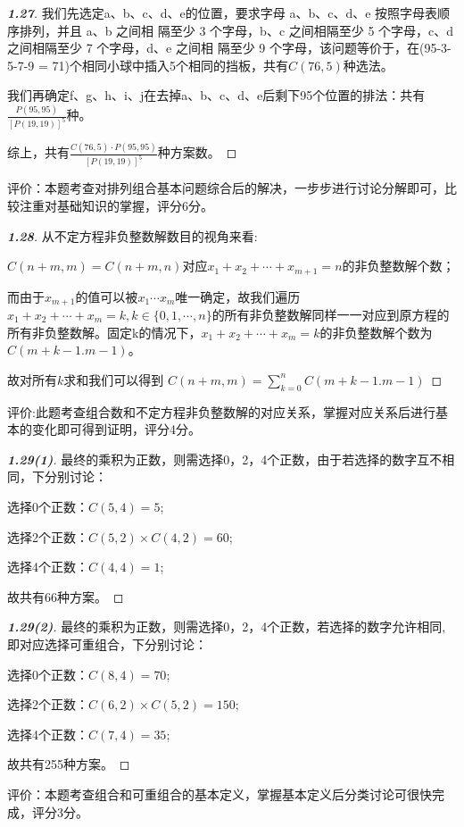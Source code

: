 \documentclass[12pt]{article}
\begin{document}
\begin{proof}[\textbf{1.27}]
    我们先选定a、b、c、d、e的位置，要求字母 a、b、c、d、e 按照字母表顺序排列，并且 a、b 之间相
隔至少 3 个字母，b、c 之间相隔至少 5 个字母，c、d 之间相隔至少 7 个字母，d、e 之间相
隔至少 9 个字母，该问题等价于，在(95-3-5-7-9 = 71)个相同小球中插入5个相同的挡板，共有$C(76,5)$种选法。

我们再确定f、g、h、i、j在去掉a、b、c、d、e后剩下95个位置的排法：共有$\frac{P(95,95)}{[P(19,19)]^5}$种。

综上，共有$\frac{C(76,5)\cdot P(95,95)}{[P(19,19)]^5}$种方案数。
\end{proof}
评价：本题考查对排列组合基本问题综合后的解决，一步步进行讨论分解即可，比较注重对基础知识的掌握，评分6分。

\begin{proof}[\textbf{1.28}]
    从不定方程非负整数解数目的视角来看:
    
    $C(n+m,m)=C(n+m,n)$对应$x_1 + x_2 + \cdots + x_{m+1} = n$的非负整数解个数；
    
    而由于$x_{m+1}$的值可以被$x_1\cdots x_m$唯一确定，故我们遍历$x_1 + x_2 + \cdots + x_m = k, k\in \{0,1,\cdots,n\}$的所有非负整数解同样一一对应到原方程的所有非负整数解。固定k的情况下，$x_1 + x_2 + \cdots + x_m = k$的非负整数解个数为$C(m+k-1.m-1)$。
    
    故对所有$k$求和我们可以得到 $C(n+m,m) = \sum_{k=0}^{n}C(m+k-1.m-1)$
\end{proof}
评价:此题考查组合数和不定方程非负整数解的对应关系，掌握对应关系后进行基本的变化即可得到证明，评分4分。

\begin{proof}[\textbf{1.29(1)}]
    最终的乘积为正数，则需选择0，2，4个正数，由于若选择的数字互不相同，下分别讨论：
    
    选择0个正数：$C(5,4) = 5$; 
    
    选择2个正数：$C(5,2) \times C(4,2) = 60$; 
    
    选择4个正数：$C(4,4) = 1$; 
    
    故共有66种方案。
\end{proof}
\begin{proof}[\textbf{1.29(2)}]
    最终的乘积为正数，则需选择0，2，4个正数，若选择的数字允许相同,即对应选择可重组合，下分别讨论：
    
    选择0个正数：$C(8,4) = 70$; 
    
    选择2个正数：$C(6,2) \times C(5,2) = 150$; 
    
    选择4个正数：$C(7,4) = 35$; 
    
    故共有255种方案。
\end{proof}
评价：本题考查组合和可重组合的基本定义，掌握基本定义后分类讨论可很快完成，评分3分。
\end{document}
